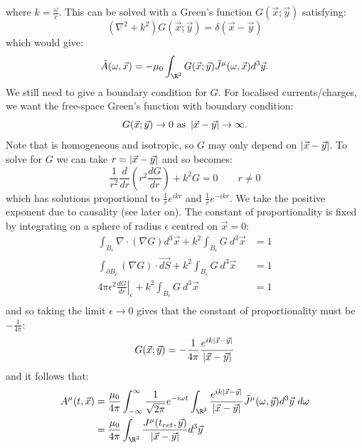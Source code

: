 \documentclass[../Main.tex]{subfiles}
\begin{document}
where $k = \frac{\omega}{c}$. This can be solved with a Green's function $G(\vec{x};\vec{y})$ satisfying:
\begin{equation}
    (\nabla^2 + k^2) G(\vec{x};\vec{y}) = \delta(\vec{x} - \vec{y})
    \label{eqnGreens}
\end{equation}
which would give:
\begin{equation*}
    \tilde{A}(\omega, \vec{x}) = -\mu_0 \int_{\R^3} G(\vec{x}; \vec{y})\tilde{J}^\mu (\omega, \vec{x}) d^3\vec{y}.
\end{equation*}
We still need to give a boundary condition for $G$. For localised currents/charges, we want the free-space Green's function with boundary condition:
\begin{equation*}
    G(\vec{x}; \vec{y}) \to 0 \text{ as } \left|\vec{x} - \vec{y}\right| \to \infty.
\end{equation*}
Note that  is homogeneous and isotropic, so $G$ may only depend on $\left|\vec{x} - \vec{y}\right|$. To solve for $G$ we can take $r = \left|\vec{x} - \vec{y}\right|$ and so  becomes:
\begin{equation*}
    \frac1{r^2} \frac{d}{dr} \left(r^2 \frac{dG}{dr}\right) + k^2 G = 0\qquad r \neq 0
\end{equation*}
which has solutions proportional to $\frac1r e^{ikr}$ and $\frac1r e^{-ikr}$. We take the positive exponent due to causality (see later on). The constant of proportionality is fixed by integrating  on a sphere of radius $\epsilon$ centred on $\vec{x} = 0$:
\begin{align*}
    \int_{B_\epsilon} \nabla \cdot (\nabla G) d^3\vec{x} + k^2 \int_{B_\epsilon} G~d^3\vec{x} &= 1 \\
    \int_{\partial B_\epsilon} (\nabla G) \cdot \vec{dS} + k^2 \int_{B_\epsilon} G~d^3\vec{x} &= 1 \\
    4\pi \epsilon^2 \left.\frac{dG}{dr}\right|_{\epsilon}+ k^2 \int_{B_\epsilon} G~d^3\vec{x} &= 1 \\
\end{align*}
and so taking the limit $\epsilon \to 0$ gives that the constant of proportionality must be $-\frac1{4\pi}$:
\begin{equation*}
    G(\vec{x};\vec{y}) = -\frac1{4\pi} \frac{e^{ik\left|\vec{x} - \vec{y}\right|}}{\left|\vec{x} - \vec{y}\right|}
\end{equation*}
and it follows that:
\begin{align}
    A^\mu (t, \vec{x}) &= \frac{\mu_0}{4\pi} \int_{-\infty}^{\infty} \frac1{\sqrt{2\pi}} e^{-i\omega t} \int_{\R^3} \frac{e^{ik\abs{\vec{x} - \vec{y}}}}{\abs{\vec{x} - \vec{y}}}\tilde{J}^\mu (\omega, \vec{y}) d^3\vec{y}~ d\omega \nonumber \\
    &= \frac{\mu_0}{4\pi} \int_{\R^3} \frac{J^\mu(t_{ret}, \vec{y})}{\abs{\vec{x} - \vec{y}}} d^3\vec{y} \label{eqnRetardedPotential}
\end{align}
\end{document}
